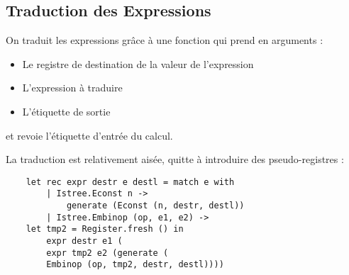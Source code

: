\documentclass{cours}
\begin{document}
\subsection{Traduction des Expressions}
On traduit les expressions grâce à une fonction qui prend en arguments :
\begin{itemize}
    \item Le registre de destination de la valeur de l'expression
    \item L'expression à traduire
    \item L'étiquette de sortie
\end{itemize}
et revoie l'étiquette d'entrée du calcul.

La traduction est relativement aisée, quitte à introduire des pseudo-registres :
\begin{verbatim}
    let rec expr destr e destl = match e with
        | Istree.Econst n ->
            generate (Econst (n, destr, destl))
        | Istree.Embinop (op, e1, e2) ->
    let tmp2 = Register.fresh () in
        expr destr e1 (
        expr tmp2 e2 (generate (
        Embinop (op, tmp2, destr, destl))))
\end{verbatim}
\end{document}
